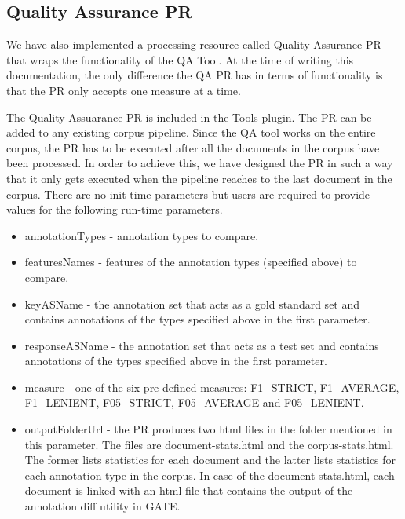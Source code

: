 \subsection[sec:eval:qapr]{Quality Assurance PR}

We have also implemented a processing resource called Quality Assurance PR that
wraps the functionality of the QA Tool.  At the time of writing this 
documentation, the only difference the QA PR has in terms of functionality is 
that the PR only accepts one measure at a time.

The Quality Assuarance PR is included in the Tools plugin.  The PR can be added 
to any existing corpus pipeline.  Since the QA tool works on the entire corpus, 
the PR has to be executed after all the documents in the corpus have been 
processed.  In order to achieve this, we have designed the PR in such a way that
it only gets executed when the pipeline reaches to the last document in the 
corpus.  There are no init-time parameters but users are required to provide 
values for the following run-time parameters.

\begin{itemize}
\item annotationTypes - annotation types to compare.
\item featuresNames - features of the annotation types (specified above) to 
compare.
\item keyASName - the annotation set that acts as a gold standard set and 
contains annotations of the types specified above in the first parameter.
\item responseASName - the annotation set that acts as a test set and contains 
annotations of the types specified above in the first parameter.
\item measure - one of the six pre-defined measures: F1\_STRICT, F1\_AVERAGE,
F1\_LENIENT, F05\_STRICT, F05\_AVERAGE and F05\_LENIENT.
\item outputFolderUrl - the PR produces two html files in the folder mentioned 
in this parameter.  The files are document-stats.html and the corpus-stats.html.
The former lists statistics for each document and the latter lists statistics 
for each annotation type in the corpus. In case of the document-stats.html, each
document is linked with an html file that contains the output of the
annotation diff utility in GATE.
\end{itemize}


